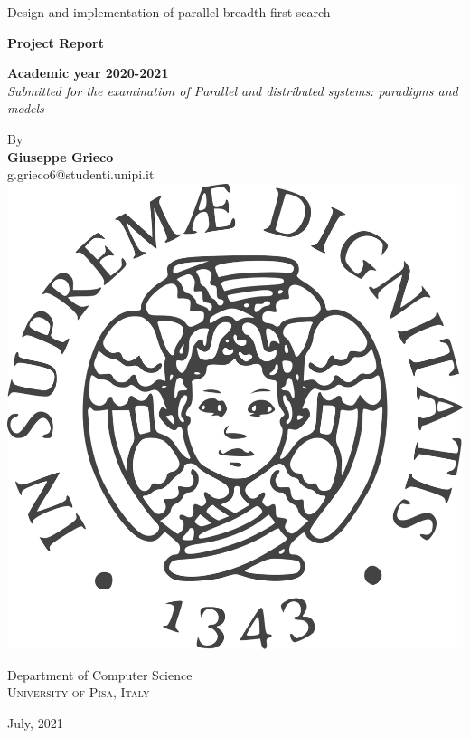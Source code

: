 \documentclass{article}
\begin{document}
\vspace*{\fill}
\begin{center}
    {\Huge{Design and implementation of parallel breadth-first search} }\\[2mm]
    \vspace{6.5mm}
    
    {\large \textbf{Project Report}}\\[5pt]
    \vspace{15mm}

    {\large \textbf{Academic year 2020-2021}}\\
    {\large \textit{Submitted for the examination of Parallel and distributed systems: paradigms and models}}\\[5pt]
    \vspace{6.5mm}

    {\large By}\\
    \vspace{3mm}
    {\large\textbf{Giuseppe Grieco}}\\
    {\large g.grieco6@studenti.unipi.it}\\

    \vspace{11mm}
    \includegraphics[scale=0.07]{./images/logo.png}\\
    \vspace{11mm}

    {\large Department of Computer Science\\
    \textsc{University of Pisa, Italy}}\\
    \vspace{15mm}

    {\large{July, 2021}}
\end{center}
\vspace*{\fill}
\newpage
\end{document}
